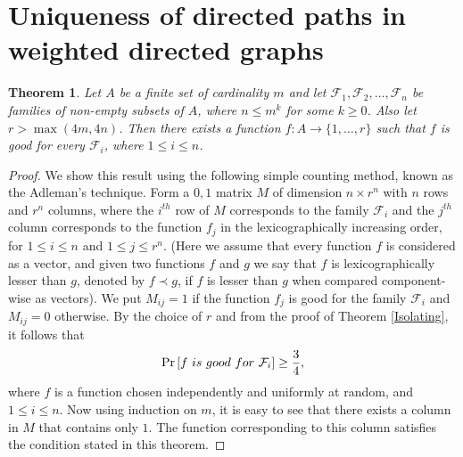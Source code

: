 \documentclass{amsbook}
\newtheorem{theorem}{Theorem}[chapter]
\theoremstyle{definition}
\theoremstyle{remark}
\numberwithin{section}{chapter}
\numberwithin{equation}{chapter}
\newcommand{\F}{\mathcal{F}}
\begin{document}
\section{Uniqueness of directed paths in weighted directed graphs}
\begin{theorem}\label{family-Isolating}
Let $A$ be a finite set of cardinality $m$ and let $\F _1,\F _2,\ldots ,\F _n$ be families of non-empty subsets of $A$, where $n\leq m^k$ for some $k\geq 0$. Also let $r>\max (4m,4n)$. Then there exists a function $f:A\rightarrow\{1,\ldots ,r\}$ such that $f$ is good for every $\F _i$, where $1\leq i\leq n$.
\end{theorem}
\begin{proof}
We show this result using the following simple counting method, known as the Adleman's technique. Form a $0,1$ matrix $M$ of dimension $n\times r^n$ with $n$ rows and $r^n$ columns, where the $i^{th}$ row of $M$ corresponds to the family $\F _i$ and the $j^{th}$ column corresponds to the function $f_j$ in the lexicographically increasing order, for $1\leq i\leq n$ and $1\leq j\leq r^n$. (Here we assume that every function $f$ is considered as a vector, and given two functions $f$ and $g$ we say that $f$ is lexicographically lesser than $g$, denoted by $f\prec g$, if $f$ is lesser than $g$ when compared component-wise as vectors). We put $M_{ij}=1$ if the function $f_j$ is good for the family $\F _i$ and $M_{ij}=0$ otherwise. By the choice of $r$ and from the proof of Theorem \ref{Isolating}, it follows that
\[
{\rm Pr}\left[f~is~good~for~\F _i\right]\geq\frac{3}{4},
\]
where $f$ is a function chosen independently and uniformly at random, and $1\leq i\leq n$. Now using induction on $m$, it is easy to see that there exists a column in $M$ that contains only $1$. The function corresponding to this column satisfies the condition stated in this theorem.
\end{proof}
\end{document}
